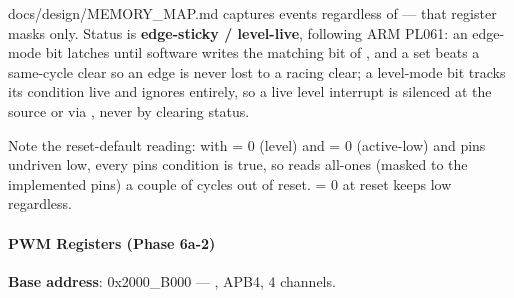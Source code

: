 \begin{relocated}{docs/design/MEMORY_MAP.md}
 captures events regardless of 
--- that register masks  only. Status is \textbf{edge-sticky
/ level-live}, following ARM PL061: an edge-mode bit latches until
software writes the matching bit of , and a set beats
a same-cycle clear so an edge is never lost to a racing clear; a
level-mode bit tracks its condition live and ignores 
entirely, so a live level interrupt is silenced at the source or via
, never by clearing status.

Note the reset-default reading: with  = 0 (level)
and  = 0 (active-low) and pins undriven low, every
pin\textquotesingle s condition is true, so  reads
all-ones (masked to the implemented pins) a couple of cycles out of
reset.  = 0 at reset keeps  low
regardless.

\paragraph{PWM Registers (Phase 6a-2)}\label{ds:mm:memory-map:pwm-registers-phase-6a-2}

\textbf{Base address}: 0x2000\_\allowbreak{}B000 ---
, APB4, 4 channels.

{\small\setlength{\tabcolsep}{4pt}

}
\end{relocated}
